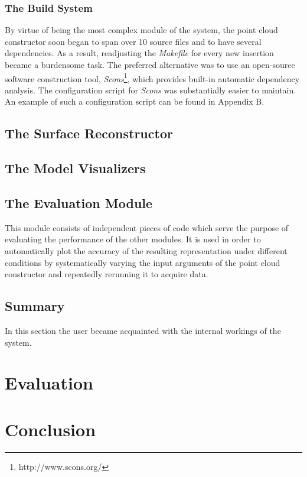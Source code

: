 \documentclass[12pt,a4paper,twoside,openright]{report}
\begin{document}
\subsection{The Build System}
By virtue of being the most complex module of the system, the point cloud constructor soon began to span over 10 source files and to have several dependencies. As a result, readjusting the \emph{Makefile} for every new insertion became a burdensome task. The preferred alternative was to use an open-source software construction tool, \emph{Scons}\footnote{http://www.scons.org/}, which provides built-in automatic dependency analysis. The configuration script for \emph{Scons} was substantially easier to maintain. An example of such a configuration script can be found in Appendix B.

\section{The Surface Reconstructor}


\section{The Model Visualizers}


\section{The Evaluation Module}
This module consists of independent pieces of code which serve the purpose of evaluating the performance of the other modules. It is used in order to automatically plot the accuracy of the resulting representation under different conditions by systematically varying the input arguments of the point cloud constructor and repeatedly rerunning  it to acquire data. 

\section{Summary} 
In this section the user became  acquainted with the internal workings of the system.  


\chapter{Evaluation}


\chapter{Conclusion}
\end{document}
